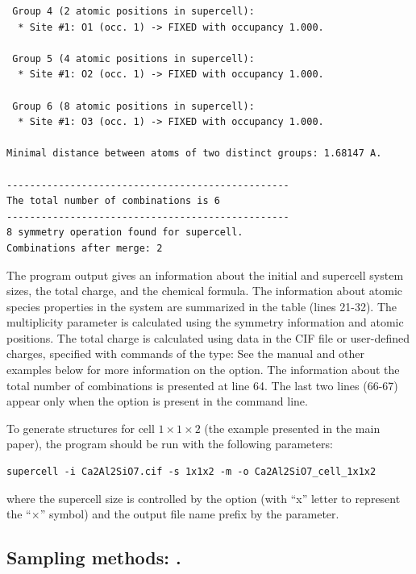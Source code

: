 \documentclass[a4paper,10pt]{article}
\begin{document}
\begin{verbatim}
 Group 4 (2 atomic positions in supercell):
  * Site #1: O1 (occ. 1) -> FIXED with occupancy 1.000.

 Group 5 (4 atomic positions in supercell):
  * Site #1: O2 (occ. 1) -> FIXED with occupancy 1.000.

 Group 6 (8 atomic positions in supercell):
  * Site #1: O3 (occ. 1) -> FIXED with occupancy 1.000.

Minimal distance between atoms of two distinct groups: 1.68147 A.

-------------------------------------------------
The total number of combinations is 6
-------------------------------------------------
8 symmetry operation found for supercell.
Combinations after merge: 2
\end{verbatim}

The program output gives an information about the initial and supercell system sizes, the total charge, and the chemical formula. The information about atomic species properties in the system are summarized in the table (lines 21-32). The multiplicity parameter is calculated using the symmetry information and atomic positions. The total charge is calculated using  data in the CIF file or user-defined charges, specified with commands of the type:
See the manual and other examples below for more information on the  option. The information about the total number of combinations is presented at line 64. The last two lines (66-67) appear only when the  option is present in the command line. 

To generate structures for cell $1\times1\times2$ (the example presented in the main paper), the \sups{} program should be run with the following parameters:
\begin{Verbatim}[breaklines]
supercell -i Ca2Al2SiO7.cif -s 1x1x2 -m -o Ca2Al2SiO7_cell_1x1x2
\end{Verbatim}
where the supercell size is controlled by the  option (with ``x'' letter to represent the ``$\times$'' symbol) and the output file name prefix by the  parameter.

\subsection*{Sampling methods: .}
\end{document}
